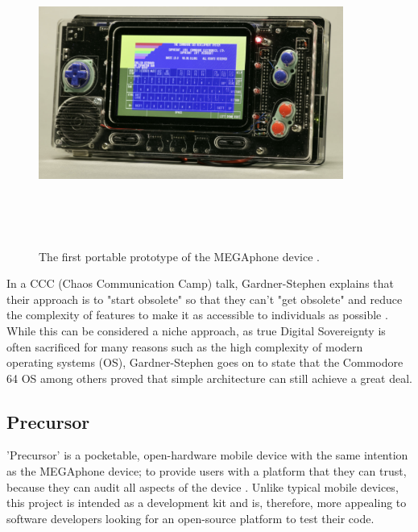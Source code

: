 \begin{figure} [h]
    \centering
    \includegraphics[width=10cm,height=10cm,keepaspectratio]{Figures/megaphone_concept.png}
    \caption{The first portable prototype of the MEGAphone device \cite{mega65}.}
    \label{fig:MEGAphoneConcept}
\end{figure}

In a CCC (Chaos Communication Camp) talk, Gardner-Stephen explains that their approach is to "start obsolete" so that they can't "get obsolete" and reduce the complexity of features to make it as accessible to individuals as possible \cite{mobilehistory}.
While this can be considered a niche approach, as true Digital Sovereignty is often sacrificed for many reasons such as the high complexity of modern operating systems (OS), Gardner-Stephen goes on to state that the Commodore 64 OS among others proved that simple architecture can still achieve a great deal.

\subsection{Precursor}

'Precursor' is a pocketable, open-hardware mobile device with the same intention as the MEGAphone device; to provide users with a platform that they can trust, because they can audit all aspects of the device \cite{precursor}.
Unlike typical mobile devices, this project is intended as a development kit and is, therefore, more appealing to software developers looking for an open-source platform to test their code.

